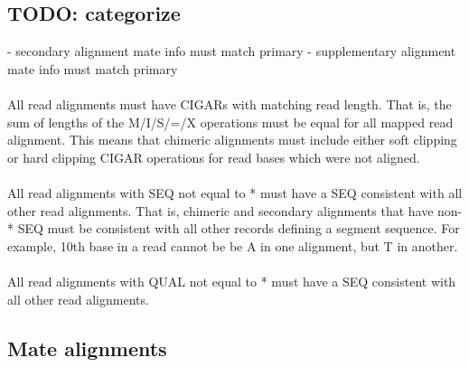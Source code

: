\documentclass[10pt]{article}
\begin{document}
\paragraph{}


\paragraph{}




\subsection{TODO: categorize}

- secondary alignment mate info must match primary
- supplementary alignment mate info must match primary

\paragraph{}

All read alignments must have CIGARs with matching read length. That is,
the sum of lengths of the M/I/S/=/X operations must be equal for all mapped read alignment.
This means that chimeric alignments must include either soft clipping or
hard clipping CIGAR operations for read bases which were not aligned.

\paragraph{}

All read alignments with SEQ not equal to * must have a SEQ consistent
with all other read alignments. That is, chimeric and secondary alignments that have non-* SEQ
must be consistent with all other records defining a segment sequence. For
example, 10th base in a read cannot be be A in one alignment, but T in another.

\paragraph{}

All read alignments with QUAL not equal to * must have a SEQ consistent
with all other read alignments.

\subsection{Mate alignments}

\paragraph{}
\end{document}
